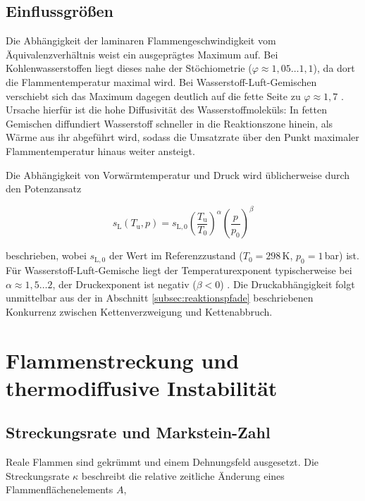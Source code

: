 \subsection{Einflussgrößen}\label{subsec:einflussgroessen}

Die Abhängigkeit der laminaren Flammengeschwindigkeit vom
Äquivalenzverhältnis weist ein ausgeprägtes Maximum auf. Bei
Kohlenwasserstoffen liegt dieses nahe der Stöchiometrie
($\varphi \approx 1{,}05\ldots1{,}1$), da dort die Flammentemperatur maximal
wird. Bei Wasserstoff-Luft-Gemischen verschiebt sich das Maximum dagegen
deutlich auf die fette Seite zu $\varphi \approx 1{,}7$
\cite{Law_2006, Egolfopoulos_1990, Dahoe_2005}. Ursache hierfür ist die hohe
Diffusivität des Wasserstoffmoleküls: In fetten Gemischen diffundiert
Wasserstoff schneller in die Reaktionszone hinein, als Wärme aus ihr
abgeführt wird, sodass die Umsatzrate über den Punkt maximaler
Flammentemperatur hinaus weiter ansteigt.

Die Abhängigkeit von Vorwärmtemperatur und Druck wird üblicherweise durch den
Potenzansatz

\begin{equation}
	\label{eq:sl_skalierung}
	s_\mathrm{L}(T_\mathrm{u}, p) = s_{\mathrm{L},0}
	\left(\frac{T_\mathrm{u}}{T_0}\right)^{\alpha}
	\left(\frac{p}{p_0}\right)^{\beta}
\end{equation}

beschrieben, wobei $s_{\mathrm{L},0}$ der Wert im Referenzzustand
($T_0 = 298\,$K, $p_0 = 1\,$bar) ist. Für Wasserstoff-Luft-Gemische liegt der
Temperaturexponent typischerweise bei $\alpha \approx 1{,}5\ldots2$, der
Druckexponent ist negativ ($\beta < 0$) \cite{Verhelst_2009}. Die
Druckabhängigkeit folgt unmittelbar aus der in
Abschnitt \ref{subsec:reaktionspfade} beschriebenen Konkurrenz zwischen
Kettenverzweigung und Kettenabbruch.

\section{Flammenstreckung und thermodiffusive Instabilität}\label{sec:streckung}

\subsection{Streckungsrate und Markstein-Zahl}\label{subsec:markstein}

Reale Flammen sind gekrümmt und einem Dehnungsfeld ausgesetzt. Die
Streckungsrate $\kappa$ beschreibt die relative zeitliche Änderung eines
Flammenflächenelements $A$,

